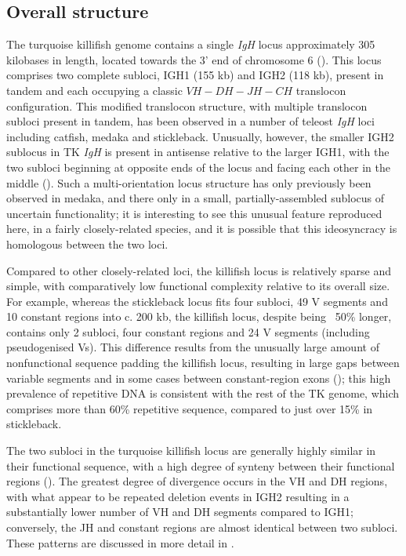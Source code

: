 	\subsection{Overall structure}
	\label{sec:nfu-locus-structure}
	
	The turquoise killifish genome contains a single \textit{IgH} locus approximately 305 kilobases in length, located towards the 3' end of chromosome 6 ().
	This locus comprises two complete subloci, IGH1 (155 kb) and IGH2 (118 kb), present in tandem and each occupying a classic ${VH-DH-JH-CH}$ translocon configuration. This modified translocon structure, with multiple translocon subloci present in tandem, has been observed in a number of teleost \textit{IgH} loci including catfish, medaka and stickleback. Unusually, however, the smaller IGH2 sublocus in TK \textit{IgH} is present in antisense relative to the larger IGH1, with the two subloci beginning at opposite ends of the locus and facing each other in the middle (). Such a multi-orientation locus structure has only previously been observed in medaka, and there only in a small, partially-assembled sublocus of uncertain functionality; it is interesting to see this unusual feature reproduced here, in a fairly closely-related species, and it is possible that this ideosyncracy is homologous between the two loci. %
	
	Compared to other closely-related loci, the killifish locus is relatively sparse and simple, with comparatively low functional complexity relative to its overall size. For example, whereas the stickleback locus fits four subloci, 49 V segments and 10 constant regions into c. 200 kb, the killifish locus, despite being ~50\% longer, contains only 2 subloci, four constant regions and 24 V segments (including pseudogenised Vs). This difference results from the unusually large amount of nonfunctional sequence padding the killifish locus, resulting in large gaps between variable segments and in some cases between constant-region exons (); this high prevalence of repetitive DNA is consistent with the rest of the TK genome, which comprises more than 60\% repetitive sequence, compared to just over 15\% in stickleback.
	
	The two subloci in the turquoise killifish locus are generally highly similar in their functional sequence, with a high degree of synteny between their functional regions (). The greatest degree of divergence occurs in the VH and DH regions, with what appear to be repeated deletion events in IGH2 resulting in a substantially lower number of VH and DH segments compared to IGH1; conversely, the JH and constant regions are almost identical between two subloci. These patterns are discussed in more detail in .
	
